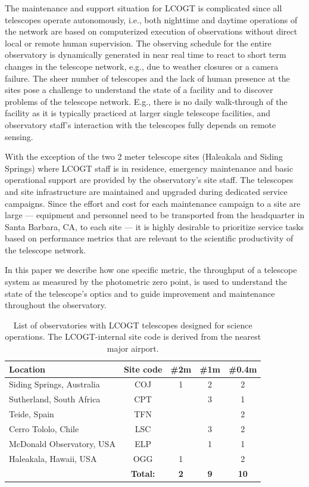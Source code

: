 \documentclass[]{spieman}
\begin{document}
The maintenance and support situation for LCOGT is complicated since all telescopes operate autonomously, 
i.e., both nighttime and daytime operations of the network are based 
on computerized execution of observations without direct local or remote human supervision. The observing 
schedule for the entire observatory is dynamically generated in near real time to 
react to short term changes in the telescope network\cite{saunders2014}, e.g., due to weather closures or a 
camera failure. The sheer number of telescopes and the lack of human presence at the sites pose a challenge 
to understand the state of a facility  and to discover problems of the telescope network. E.g., there is no 
daily walk-through of the facility as it is typically practiced at larger single telescope facilities, and 
observatory staff's interaction with the telescopes fully depends on remote sensing. 

With the exception of the two 2 meter telescope sites (Haleakala and Siding Springs) where LCOGT staff
is in residence, emergency maintenance and basic operational support are provided by the
observatory's site staff. The telescopes and site infrastructure are maintained and upgraded during
dedicated service campaigns. Since the effort and cost for each maintenance campaign to a site are
large --- equipment and personnel need to be transported from the headquarter in Santa Barbara, CA,
to each site --- it is highly desirable to prioritize service tasks based on performance metrics
that are relevant to the scientific productivity of the telescope network.



In this paper we describe how one specific metric, the throughput of a telescope system as measured
by the photometric zero point, is used to understand the state of the
telescope's optics and to guide improvement and maintenance throughout the observatory.


\begin{table}[h]
\centering
\begin{tabular} {|l|c|ccc|} \hline
Location                  & Site code & \#2m & \#1m & \#0.4m \\ \hline
Siding Springs, Australia & COJ & 1 & 2 & 2  \\
Sutherland, South Africa  & CPT &   & 3 & 1 \\
Teide, Spain              & TFN &   &   & 2 \\
Cerro Tololo, Chile       & LSC &   & 3 & 2 \\
McDonald Observatory, USA & ELP &   & 1 & 1\\
Haleakala, Hawaii, USA    & OGG & 1 &   & 2 \\\hline
                       &   \bf Total:  & \bf 2 & \bf 9 & \bf 10 \\ \hline
\end{tabular}
\vspace{1ex}
\caption{\label{tab_sites} List of observatories with LCOGT telescopes designed for science
operations. The LCOGT-internal site code is derived from the nearest major airport. }
\end{table}
\end{document}
